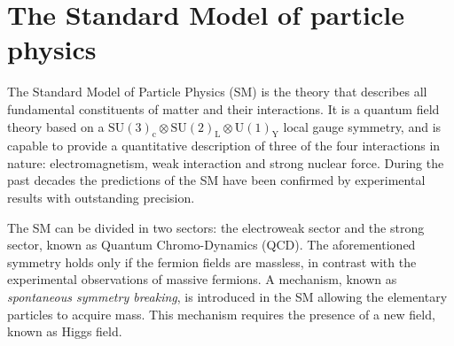 \section{The Standard Model of particle physics}
\label{sec:SM}

The Standard Model of Particle Physics (SM) is the theory that describes all fundamental constituents of matter and their interactions. It is a quantum field theory based on a $\mathrm{SU(3)_c \otimes SU(2)_L \otimes U(1)_Y}$ local gauge symmetry, and is capable to provide a quantitative description of three of the four interactions in nature: electromagnetism, weak interaction and strong nuclear force. During the past decades the predictions of the SM have been confirmed by experimental results with outstanding precision.

The SM can be divided in two sectors: the electroweak sector and the strong sector, known as Quantum Chromo-Dynamics (QCD). The aforementioned symmetry holds only if the fermion fields are massless, in contrast with the experimental observations of massive fermions. A mechanism, known as \emph{spontaneous symmetry breaking}, is introduced in the SM allowing the elementary particles to acquire mass. This mechanism requires the presence of a new field, known as Higgs field.
